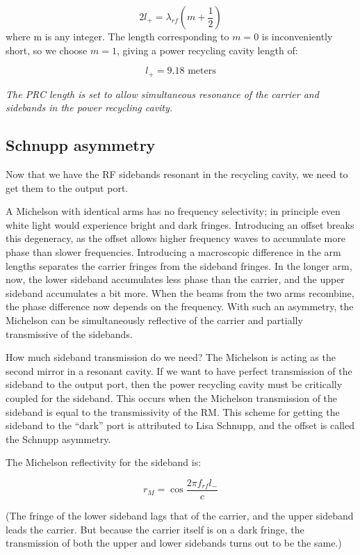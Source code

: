 \[
2l_{+}=\lambda_{rf}\left(m+\frac{1}{2}\right)
\]
where m is any integer. The length corresponding to $m=0$ is inconveniently
short, so we choose $m=1$, giving a power recycling cavity length of:

\[
\boxed{{l_{+}=9.18\text{{\ meters}}}}
\]


\emph{The PRC length is set to allow simultaneous resonance of the
carrier and sidebands in the power recycling cavity.}


\subsection*{Schnupp asymmetry}

Now that we have the RF sidebands resonant in the recycling cavity,
we need to get them to the output port. 

A Michelson with identical arms has no frequency selectivity; in principle
even white light would experience bright and dark fringes. Introducing
an offset breaks this degeneracy, as the offset allows higher frequency
waves to accumulate more phase than slower frequencies. Introducing
a macroscopic difference in the arm lengths separates the carrier
fringes from the sideband fringes. In the longer arm, now, the lower
sideband accumulates less phase than the carrier, and the upper sideband
accumulates a bit more. When the beams from the two arms recombine,
the phase difference now depends on the frequency. With such an asymmetry,
the Michelson can be simultaneously reflective of the carrier and
partially transmissive of the sidebands. 

How much sideband transmission do we need? The Michelson is acting
as the second mirror in a resonant cavity. If we want to have perfect
transmission of the sideband to the output port, then the power recycling
cavity must be critically coupled for the sideband. This occurs when
the Michelson transmission of the sideband is equal to the transmissivity
of the RM. This scheme for getting the sideband to the {}``dark'' port is attributed
to Lisa Schnupp, and the offset is called the Schnupp asymmetry.

The Michelson reflectivity for the sideband is:

\begin{equation}
r_{M}=\cos\frac{2\pi f_{rf}l_{-}}{c}
\end{equation}

(The fringe of the lower sideband lags that of
the carrier, and the upper sideband leads the carrier. But because
the carrier itself is on a dark fringe, the transmission of both the
upper and lower sidebands turns out to be the same.)

